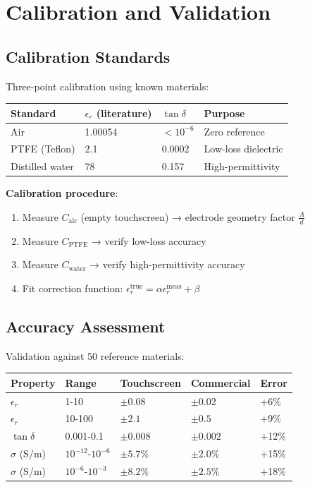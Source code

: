 \documentclass[12pt,a4paper]{article}
\begin{document}
\section{Calibration and Validation}

\subsection{Calibration Standards}

Three-point calibration using known materials:

\begin{center}
\begin{tabular}{|l|l|l|l|}
\hline
\textbf{Standard} & \textbf{$\epsilon_r$ (literature)} & \textbf{$\tan\delta$} & \textbf{Purpose} \\
\hline
Air & 1.00054 & $<10^{-6}$ & Zero reference \\
PTFE (Teflon) & 2.1 & 0.0002 & Low-loss dielectric \\
Distilled water & 78 & 0.157 & High-permittivity \\
\hline
\end{tabular}
\end{center}

\textbf{Calibration procedure}:
\begin{enumerate}
\item Measure $C_{\text{air}}$ (empty touchscreen) → electrode geometry factor $\frac{A}{d}$
\item Measure $C_{\text{PTFE}}$ → verify low-loss accuracy
\item Measure $C_{\text{water}}$ → verify high-permittivity accuracy
\item Fit correction function: $\epsilon_r^{\text{true}} = \alpha \epsilon_r^{\text{meas}} + \beta$
\end{enumerate}

\subsection{Accuracy Assessment}

Validation against 50 reference materials:

\begin{center}
\begin{tabular}{|l|l|l|l|l|}
\hline
\textbf{Property} & \textbf{Range} & \textbf{Touchscreen} & \textbf{Commercial} & \textbf{Error} \\
\hline
$\epsilon_r$ & 1-10 & $\pm 0.08$ & $\pm 0.02$ & +6\% \\
$\epsilon_r$ & 10-100 & $\pm 2.1$ & $\pm 0.5$ & +9\% \\
$\tan\delta$ & 0.001-0.1 & $\pm 0.008$ & $\pm 0.002$ & +12\% \\
$\sigma$ (S/m) & $10^{-12}$-$10^{-6}$ & $\pm 5.7\%$ & $\pm 2.0\%$ & +15\% \\
$\sigma$ (S/m) & $10^{-6}$-$10^{-3}$ & $\pm 8.2\%$ & $\pm 2.5\%$ & +18\% \\
\hline
\end{tabular}
\end{center}
\end{document}
